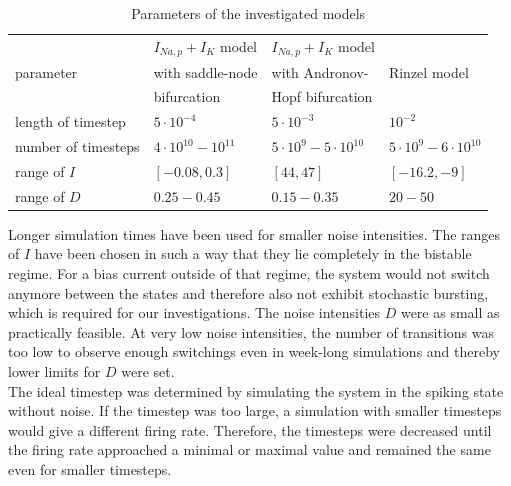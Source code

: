 \documentclass[12pt,a4paper]{article}
\begin{document}
\begin{table}[h]

\begin{tabular}{|l|l|l|l|}
	\hline
	 & $I_{Na,p}+I_K$ model  & $I_{Na,p}+I_K$ model & \\ parameter &  with saddle-node & with Andronov- &Rinzel model\\ & bifurcation & Hopf bifurcation &\\
	\hline
	length of timestep&$5\cdot 10^{-4}$&$5\cdot10^{-3}$&$10^{-2}$\\\hline
	number of timesteps&$4\cdot10^{10}-10^{11}$&$5\cdot10^9-5\cdot10^{10}$&$5\cdot10^9-6\cdot10^{10}$\\\hline
	range of $I$&$[-0.08,0.3]$&$[44,47]$&$[-16.2,-9]$\\\hline
	range of $D$&$0.25-0.45$&$0.15-0.35$&$20-50$\\
	\hline
\end{tabular}
\caption{Parameters of the investigated models}	
\label{params}
\end{table}
Longer simulation times have been used for smaller noise intensities. The ranges of $I$ have been chosen in such a way that they lie completely in the bistable regime. For a bias current outside of that regime, the system would not switch anymore between the states and therefore also not exhibit stochastic bursting, which is required for our investigations. The noise intensities $D$ were as small as practically feasible. At very low noise intensities, the number of transitions was too low to observe enough switchings even in week-long simulations and thereby lower limits for $D$ were set.\\The ideal timestep was determined by simulating the system in the spiking state without noise. If the timestep was too large, a simulation with smaller timesteps would give a different firing rate. Therefore, the timesteps were decreased until the firing rate approached a minimal or maximal value and remained the same even for smaller timesteps.%
\end{document}
